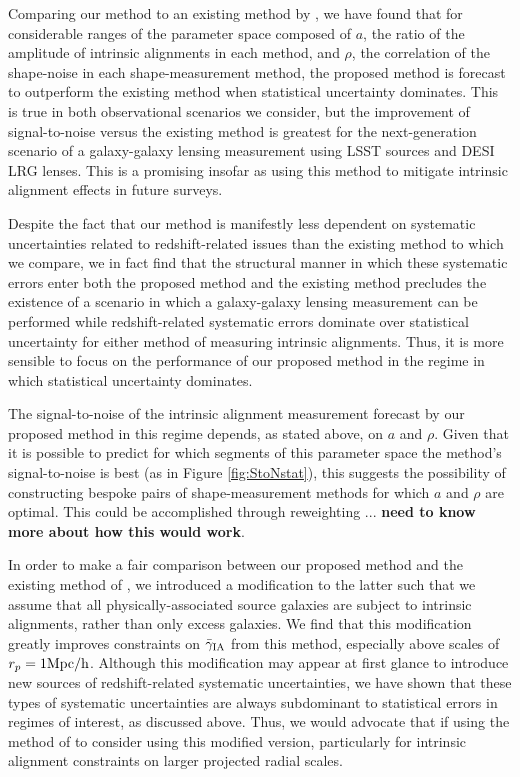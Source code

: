 \documentclass[a4paper,fleqn,usenatbib]{mnras}
\begin{document}
Comparing our method to an existing method by \cite{Blazek2012}, we have found that for considerable ranges of the parameter space composed of $a$, the ratio of the amplitude of intrinsic alignments in each method, and $\rho$, the correlation of the shape-noise in each shape-measurement method, the proposed method is forecast to outperform the existing method when statistical uncertainty dominates. This is true in both observational scenarios we consider, but the improvement of signal-to-noise versus the existing method is greatest for the next-generation scenario of a galaxy-galaxy lensing measurement using LSST sources and DESI LRG lenses. This is a promising insofar as using this method to mitigate intrinsic alignment effects in future surveys. 

Despite the fact that our method is manifestly less dependent on systematic uncertainties related to redshift-related issues than the existing method to which we compare, we in fact find that the structural manner in which these systematic errors enter both the proposed method and the existing method precludes the existence of a scenario in which a galaxy-galaxy lensing measurement can be performed while redshift-related systematic errors dominate over statistical uncertainty for either method of measuring intrinsic alignments. Thus, it is more sensible to focus on the performance of our proposed method in the regime in which statistical uncertainty dominates.

The signal-to-noise of the intrinsic alignment measurement forecast by our proposed method in this regime depends, as stated above, on $a$ and $\rho$. Given that it is possible to predict for which segments of this parameter space the method's signal-to-noise is best (as in Figure \ref{fig:StoNstat}), this suggests the possibility of constructing bespoke pairs of shape-measurement methods for which $a$ and $\rho$ are optimal. This could be accomplished through reweighting ... {\bf need to know more about how this would work}.

In order to make a fair comparison between our proposed method and the existing method of \cite{Blazek2012}, we introduced a modification to the latter such that we assume that all physically-associated source galaxies are subject to intrinsic alignments, rather than only excess galaxies. We find that this modification greatly improves constraints on $\bar{\gamma}_{\rm IA}$ from this method, especially above scales of $r_p = 1 {\rm Mpc/h}$. Although this modification may appear at first glance to introduce new sources of redshift-related systematic uncertainties, we have shown that these types of systematic uncertainties are always subdominant to statistical errors in regimes of interest, as discussed above. Thus, we would advocate that if using the method of \cite{Blazek2012} to consider using this modified version, particularly for intrinsic alignment constraints on larger projected radial scales.
\end{document}
